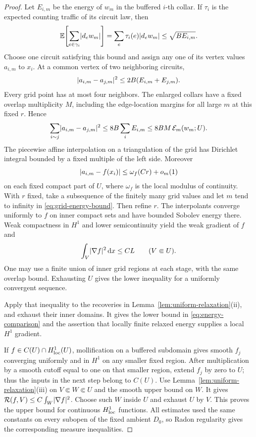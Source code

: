 \begin{proof}
Let \(E_{i,m}\) be the energy of \(w_m\) in the buffered \(i\)-th collar.
If \(\tau_i\) is the expected counting traffic of its circuit law, then
\[
 \mathbb E\!\left[\sum_{e\in\gamma_i}\lvert d_e w_m\rvert\right]
   =\sum_e\tau_i(e)\lvert d_e w_m\rvert
   \le \sqrt{B E_{i,m}}.
\]
Choose one circuit satisfying this bound and assign any one of its
vertex values \(a_{i,m}\) to \(x_i\).  At a common vertex of two
neighboring circuits,
\[
 \lvert a_{i,m}-a_{j,m}\rvert^2
       \le 2B(E_{i,m}+E_{j,m}).
\]
Every grid point has at most four neighbors.  The enlarged collars have
a fixed overlap multiplicity \(M\), including the edge-location margins
for all large \(m\) at this fixed \(r\).  Hence
\begin{equation}\label{eq:grid-energy-bound}
 \sum_{i\sim j}\lvert a_{i,m}-a_{j,m}\rvert^2
 \le 8B\sum_i E_{i,m}
 \le 8BM\,\mathcal E_m(w_m;U).
\end{equation}
The piecewise affine interpolation on a triangulation of the grid has
Dirichlet integral bounded by a fixed multiple of the left side.
Moreover
\[
 \lvert a_{i,m}-f(x_i)\rvert
 \le \omega_f(Cr)+o_m(1)
\]
on each fixed compact part of \(U\), where \(\omega_f\) is the local
modulus of continuity.  With \(r\) fixed, take a subsequence of the
finitely many grid values and let \(m\) tend to infinity in
\eqref{eq:grid-energy-bound}.  Then refine \(r\).  The interpolants
converge uniformly to \(f\) on inner compact sets and have bounded
Sobolev energy there.  Weak compactness in \(H^1\) and lower
semicontinuity yield the weak gradient of \(f\) and
\[
 \int_V\lvert \nabla f\rvert^2\,\mathrm d x\le C L
 \qquad(V\Subset U).
\]
One may use a finite union of inner grid regions at each stage, with
the same overlap bound.  Exhausting \(U\) gives the lower inequality
for a uniformly convergent sequence.

Apply that inequality to the recoveries in
Lemma~\ref{lem:uniform-relaxation}(ii), and exhaust their inner
domains.  It gives the lower bound in \eqref{eq:energy-comparison}
and the assertion that locally finite relaxed energy supplies a local
\(H^1\) gradient.

If \(f\in C(U)\cap H^1_{\rm loc}(U)\), mollification on a buffered
subdomain gives smooth \(f_j\) converging uniformly and in \(H^1\)
on any smaller fixed region.  After multiplication by a smooth cutoff
equal to one on that smaller region, extend \(f_j\) by zero to \(U\);
thus the inputs in the next step belong to \(C(U)\).  Use
Lemma~\ref{lem:uniform-relaxation}(iii) on \(V\Subset W\Subset U\)
and the smooth upper bound on \(W\).  It gives
\(\mathcal R(f,V)\le C\int_W\lvert \nabla f\rvert^2\).
Choose such \(W\) inside \(U\) and exhaust \(U\) by \(V\).
This proves the upper bound for continuous \(H^1_{\rm loc}\)
functions.  All estimates used the same constants on every subopen of
the fixed ambient \(D_0\), so Radon regularity gives the corresponding
measure inequalities.
\end{proof}

